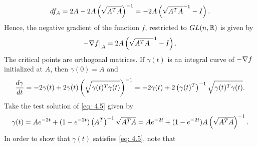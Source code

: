 \begin{equation*}\label{gradfForGL}
    df_A  = 2A-2A\left( \sqrt{A^TA} \right)^{-1}=-2A \left( \sqrt{A^TA}^{-1}-I \right).
\end{equation*}
Hence, the negative gradient of the function $f$, restricted to $GL(n,\mathbb{R})$ is given by 
\begin{displaymath}
	-\nabla f\big|_A = 2A\left( \sqrt{A^TA}^{-1}-I \right).
\end{displaymath}
The critical points are orthogonal matrices. If $\gamma(t)$ is an integral curve of $-\nabla f$ initialized at $A$, then $\gamma(0)=A$ and 
\begin{equation}
\dfrac{d\gamma}{dt} =-2\gamma(t)+2\gamma(t)\left( \sqrt{\gamma(t)^T\gamma(t)} \right)^{-1}=-2\gamma(t)+2\left( \gamma(t)^T \right)^{-1}\sqrt{\gamma(t)^T\gamma(t)} \label{eq: 4.5}.
\end{equation}
Take the test solution of \eqref{eq: 4.5} given by
\begin{equation}\label{eq: 4.6}
\gamma(t)  = Ae^{-2t} + (1-e^{-2t})\left( A^T \right)^{-1}\sqrt{A^TA} = Ae^{-2t} + (1-e^{-2t})A\left( \sqrt{A^TA} \right)^{-1}.
\end{equation}
\noindent In order to show that $\gamma(t)$ satisfies \eqref{eq: 4.5}, note that
